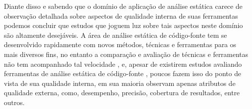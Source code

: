 Diante disso e sabendo que o domínio de aplicação de análise estática carece de
observação detalhada sobre aspectos de qualidade interna de suas ferramentas
podemos concluir que estudos que joguem luz sobre tais aspectos neste domínio
são altamente desejáveis. A área de análise estática de código-fonte tem se
desenvolvido rapidamente com novos métodos, técnicas e ferramentas para os mais
diversos fins, no entanto a comparação e avaliação de técnicas e ferramentas
não tem acompanhado tal velocidade \cite{Li2010}, e, apesar de existirem
estudos avaliando ferramentas de análise estática de código-fonte
\cite{Rutar2004, Kratkiewicz2005, Okun2007, Emanuelsson2008, Wedyan2009,
Mantere2009, Al2010, Li2010, Johns2011, Alemerien2013, Ataide2014}, poucos
fazem isso do ponto de vista de sua qualidade interna, em sua maioria observam
apenas atributos de qualidade externa, como, desempenho, precisão, cobertura de
resultados, entre outros.



